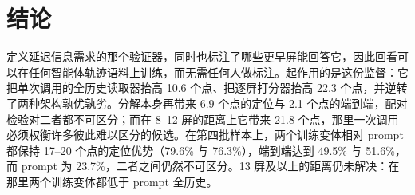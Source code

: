 \section{结论}
定义延迟信息需求的那个验证器，同时也标注了哪些更早屏能回答它，因此回看可以在任何智能体轨迹语料上训练，而无需任何人做标注。起作用的是这份监督：它把单次调用的全历史读取器抬高 10.6 个点、把逐屏打分器抬高 22.3 个点，并逆转了两种架构孰优孰劣。分解本身再带来 6.9 个点的定位与 2.1 个点的端到端，配对检验对二者都不可区分；而在 8--12 屏的距离上它带来 21.8 个点，那里一次调用必须权衡许多彼此难以区分的候选。在第四批样本上，两个训练变体相对 prompt 都保持 17--20 个点的定位优势（79.6\% 与 76.3\%），端到端达到 49.5\% 与 51.6\%，而 prompt 为 23.7\%，二者之间仍然不可区分。13 屏及以上的距离仍未解决：在那里两个训练变体都低于 prompt 全历史。
